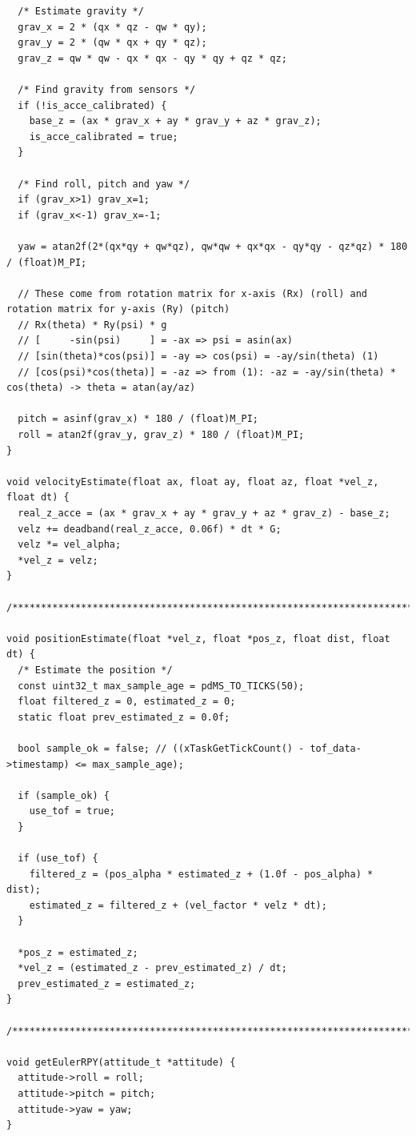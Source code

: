 \begin{lstlisting}
  /* Estimate gravity */
  grav_x = 2 * (qx * qz - qw * qy);
  grav_y = 2 * (qw * qx + qy * qz);
  grav_z = qw * qw - qx * qx - qy * qy + qz * qz;

  /* Find gravity from sensors */
  if (!is_acce_calibrated) {
    base_z = (ax * grav_x + ay * grav_y + az * grav_z);
    is_acce_calibrated = true;
  }

  /* Find roll, pitch and yaw */
  if (grav_x>1) grav_x=1;
  if (grav_x<-1) grav_x=-1;

  yaw = atan2f(2*(qx*qy + qw*qz), qw*qw + qx*qx - qy*qy - qz*qz) * 180 / (float)M_PI;

  // These come from rotation matrix for x-axis (Rx) (roll) and rotation matrix for y-axis (Ry) (pitch)
  // Rx(theta) * Ry(psi) * g
  // [     -sin(psi)     ] = -ax => psi = asin(ax)
  // [sin(theta)*cos(psi)] = -ay => cos(psi) = -ay/sin(theta) (1)
  // [cos(psi)*cos(theta)] = -az => from (1): -az = -ay/sin(theta) * cos(theta) -> theta = atan(ay/az)

  pitch = asinf(grav_x) * 180 / (float)M_PI;
  roll = atan2f(grav_y, grav_z) * 180 / (float)M_PI;
}

void velocityEstimate(float ax, float ay, float az, float *vel_z, float dt) {
  real_z_acce = (ax * grav_x + ay * grav_y + az * grav_z) - base_z;
  velz += deadband(real_z_acce, 0.06f) * dt * G;
  velz *= vel_alpha;
  *vel_z = velz;
}

/**********************************************************************/

void positionEstimate(float *vel_z, float *pos_z, float dist, float dt) {
  /* Estimate the position */
  const uint32_t max_sample_age = pdMS_TO_TICKS(50);
  float filtered_z = 0, estimated_z = 0;
  static float prev_estimated_z = 0.0f;

  bool sample_ok = false; // ((xTaskGetTickCount() - tof_data->timestamp) <= max_sample_age);

  if (sample_ok) {
    use_tof = true;
  }

  if (use_tof) {
    filtered_z = (pos_alpha * estimated_z + (1.0f - pos_alpha) * dist);
    estimated_z = filtered_z + (vel_factor * velz * dt);
  } 

  *pos_z = estimated_z;
  *vel_z = (estimated_z - prev_estimated_z) / dt;
  prev_estimated_z = estimated_z;
}

/**********************************************************************/

void getEulerRPY(attitude_t *attitude) {
  attitude->roll = roll; 
  attitude->pitch = pitch;
  attitude->yaw = yaw;
}


\end{lstlisting}
